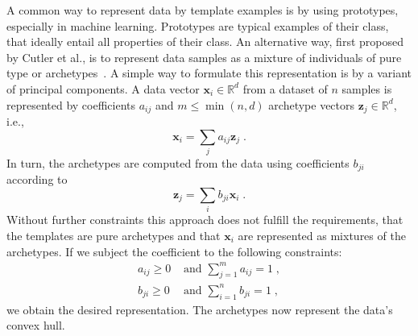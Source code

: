 A common way to represent data by template examples is by using prototypes,
especially in machine learning. Prototypes are typical examples of their class,
that ideally entail all properties of their class. An alternative way, first
proposed by Cutler et al., is to represent data samples as a mixture of
individuals of pure type or archetypes~\citep{cutlerArchetypalAnalysis1994}. A
simple way to formulate this representation is by a variant of principal
components. A data vector $\mathbf{x}_i \in \mathbb{R}^d$ from a dataset of $n$
samples is represented by coefficients $a_{ij}$ and $m \leq \min(n, d)$
archetype vectors $\mathbf{z}_j \in \mathbb{R}^d$, i.e.,
\begin{equation}%
    \label{eq:data_from_archetypes}
    \mathbf{x}_i = \sum_j a_{ij} \mathbf{z}_j\;.
\end{equation}
In turn, the archetypes are computed from the data using coefficients $b_{ji}$
according to
\begin{equation}%
    \label{eq:archetypes_from_data}
    \mathbf{z}_j = \sum_i b_{ji} \mathbf{x}_i\;.
\end{equation}
Without further constraints this approach does not fulfill the requirements,
that the templates are pure archetypes and that $\mathbf{x}_i$ are represented as
mixtures of the archetypes. If we subject the coefficient to the following
constraints:
\begin{equation}
    \begin{aligned}%
        \label{eq:archetype_constraints}
        a_{ij} \geq 0 &\textrm{ and } \sum_{j=1}^{m} a_{ij} = 1\;, \\
        b_{ji} \geq 0 &\textrm{ and } \sum_{i=1}^{n} b_{ji} = 1\;,
    \end{aligned}   
\end{equation}
we obtain the desired representation. The archetypes now represent the data's
convex hull.

